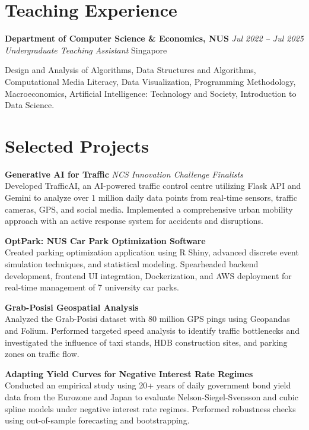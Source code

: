 \documentclass[10pt,a4paper]{article}
\newcommand{\cventry}[4]{%
\textbf{#1} \hfill \textit{#2} \\
\textit{#3} \hfill #4
\vspace{2pt}
}
\newcommand{\cvsubentry}[2]{%
\textbf{#1} \hfill \textit{#2}\vspace{1pt}
}
\begin{document}
\section{Teaching Experience}

\cventry{Department of Computer Science \& Economics, NUS}{Jul 2022 -- Jul 2025}{Undergraduate Teaching Assistant}{Singapore}

Design and Analysis of Algorithms, Data Structures and Algorithms, Computational Media Literacy, Data Visualization, Programming Methodology, Macroeconomics, Artificial Intelligence: Technology and Society, Introduction to Data Science. 

\section{Selected Projects}

\cvsubentry{Generative AI for Traffic}{NCS Innovation Challenge Finalists}\\
Developed TrafficAI, an AI-powered traffic control centre utilizing Flask API and Gemini to analyze over 1 million daily data points from real-time sensors, traffic cameras, GPS, and social media. Implemented a comprehensive urban mobility approach with an active response system for accidents and disruptions.

\vspace{4pt}

\cvsubentry{OptPark: NUS Car Park Optimization Software}{}\\
Created parking optimization application using R Shiny, advanced discrete event simulation techniques, and statistical modeling. Spearheaded backend development, frontend UI integration, Dockerization, and AWS deployment for real-time management of 7 university car parks.

\vspace{4pt}

\cvsubentry{Grab-Posisi Geospatial Analysis}{}\\
Analyzed the Grab-Posisi dataset with 80 million GPS pings using Geopandas and Folium. Performed targeted speed analysis to identify traffic bottlenecks and investigated the influence of taxi stands, HDB construction sites, and parking zones on traffic flow.

\vspace{4pt}

\cvsubentry{Adapting Yield Curves for Negative Interest Rate Regimes}{}\\
Conducted an empirical study using 20+ years of daily government bond yield data from the Eurozone and Japan to evaluate Nelson-Siegel-Svensson and cubic spline models under negative interest rate regimes. Performed robustness checks using out-of-sample forecasting and bootstrapping.
\end{document}
